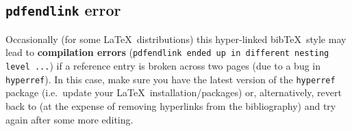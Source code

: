 \documentclass[journal]{vgtc}                     %
\begin{document}
\subsection{\texttt{pdfendlink} error}

Occasionally (for some \LaTeX\ distributions) this hyper-linked bib\TeX\ style may lead to \textbf{compilation errors} (\texttt{pdfendlink ended up in different nesting level ...}) if a reference entry is broken across two pages (due to a bug in \verb|hyperref|).
In this case, make sure you have the latest version of the \verb|hyperref| package (i.e.\ update your \LaTeX\ installation/packages) or, alternatively, revert back to \verb|| (at the expense of removing hyperlinks from the bibliography) and try \verb|| again after some more editing.
\end{document}
